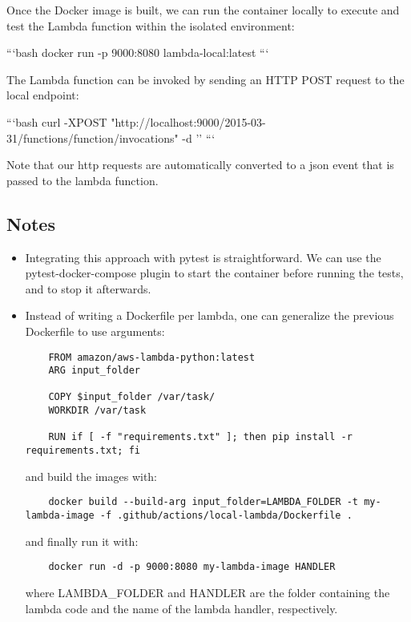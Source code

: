 \documentclass{article}
\begin{document}
Once the Docker image is built, we can run the container locally to execute and test the Lambda function within the isolated environment:

```bash
docker run -p 9000:8080 lambda-local:latest
```

The Lambda function can be invoked by sending an HTTP POST request to the local endpoint:

```bash
curl -XPOST "http://localhost:9000/2015-03-31/functions/function/invocations" -d '{}'
```

Note that our http requests are automatically converted to a json event that is passed to the lambda function.

\subsection{Notes}
\begin{itemize}
\item Integrating this approach with pytest is straightforward. We can use the pytest-docker-compose plugin to start the container before running the tests, and to stop it afterwards.
\item Instead of writing a Dockerfile per lambda, one can generalize the previous Dockerfile to use arguments:

\begin{verbatim}
    FROM amazon/aws-lambda-python:latest
    ARG input_folder

    COPY $input_folder /var/task/
    WORKDIR /var/task

    RUN if [ -f "requirements.txt" ]; then pip install -r requirements.txt; fi

\end{verbatim}

and build the images with:

\begin{verbatim}
    docker build --build-arg input_folder=LAMBDA_FOLDER -t my-lambda-image -f .github/actions/local-lambda/Dockerfile .
\end{verbatim}

and finally run it with:
\begin{verbatim}
    docker run -d -p 9000:8080 my-lambda-image HANDLER
\end{verbatim}

where LAMBDA\_FOLDER and HANDLER are the folder containing the lambda code and the name of the lambda handler, respectively.

\end{itemize}
\end{document}

